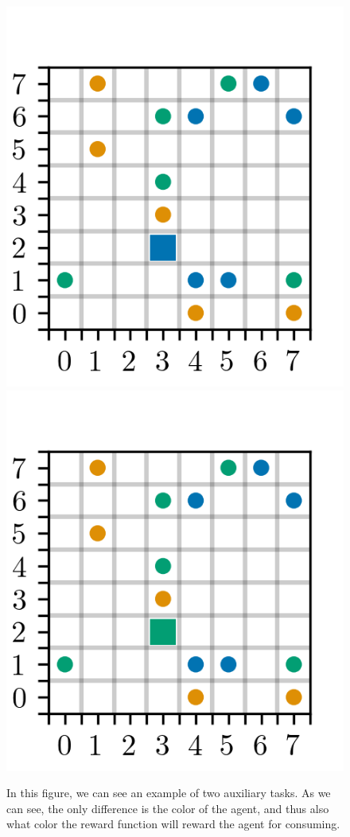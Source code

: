 \documentclass[12pt,A4]{report}
\theoremstyle{definition}
\begin{document}
\begin{figure}[H]
  \centering
  \includegraphics{"figures/aux_1.png"}
  \includegraphics{"figures/aux_2.png"}
  \caption{In this figure, we can see an example of two auxiliary tasks. As we can see, the only difference is the color of the agent, and thus also what color the reward function will reward the agent for consuming.}
  \label{fig:aux_tasks}
\end{figure}
\end{document}
